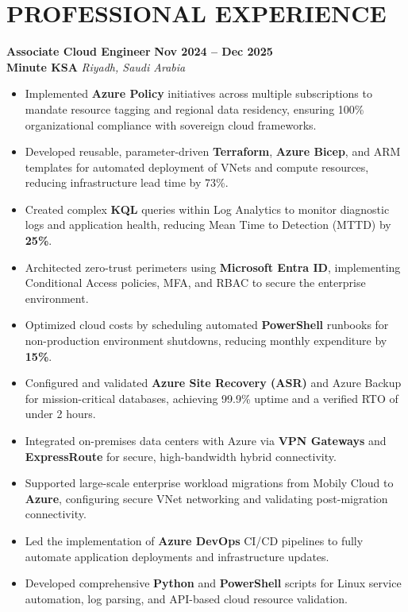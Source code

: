 \documentclass[10pt,a4paper]{article}
\newcommand{\jobheading}[4]{
  \vspace{1.5ex}\noindent
  {\large\textbf{\color{darkteal}#1}} \hfill \textbf{\color{textmain}#2} \\[0.3ex]
  \textbf{\color{textdark}#3} \hfill \textit{\color{textmain}#4} \vspace{0.8ex}
}
\begin{document}
\section*{PROFESSIONAL EXPERIENCE}

\jobheading{Associate Cloud Engineer}{Nov 2024 – Dec 2025}{Minute KSA}{Riyadh, Saudi Arabia}
\begin{itemize}[label={\color{teal}\textbullet},leftmargin=*,itemsep=3pt,parsep=1pt,topsep=1pt]
    \item Implemented \textbf{Azure Policy} initiatives across multiple subscriptions to mandate resource tagging and regional data residency, ensuring 100\% organizational compliance with sovereign cloud frameworks.
    \item Developed reusable, parameter-driven \textbf{Terraform}, \textbf{Azure Bicep}, and ARM templates for automated deployment of VNets and compute resources, reducing infrastructure lead time by 73\%.
    \item Created complex \textbf{KQL} queries within Log Analytics to monitor diagnostic logs and application health, reducing Mean Time to Detection (MTTD) by \textbf{25\%}.
    \item Architected zero-trust perimeters using \textbf{Microsoft Entra ID}, implementing Conditional Access policies, MFA, and RBAC to secure the enterprise environment.
    \item Optimized cloud costs by scheduling automated \textbf{PowerShell} runbooks for non-production environment shutdowns, reducing monthly expenditure by \textbf{15\%}.
    \item Configured and validated \textbf{Azure Site Recovery (ASR)} and Azure Backup for mission-critical databases, achieving 99.9\% uptime and a verified RTO of under 2 hours.
    \item Integrated on-premises data centers with Azure via \textbf{VPN Gateways} and \textbf{ExpressRoute} for secure, high-bandwidth hybrid connectivity.
    \item Supported large-scale enterprise workload migrations from Mobily Cloud to \textbf{Azure}, configuring secure VNet networking and validating post-migration connectivity.
    \item Led the implementation of \textbf{Azure DevOps} CI/CD pipelines to fully automate application deployments and infrastructure updates.
    \item Developed comprehensive \textbf{Python} and \textbf{PowerShell} scripts for Linux service automation, log parsing, and API-based cloud resource validation.
\end{itemize}
\end{document}
